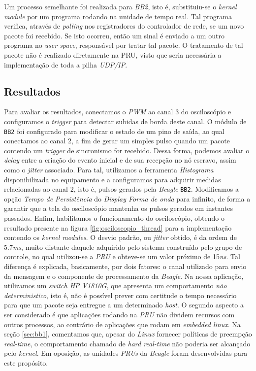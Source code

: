 \vspace{12pt}

Um processo semelhante foi realizada para \textit{BB2}, isto é, substituiu-se o
\textit{kernel module} por um programa rodando na unidade de tempo real. Tal
programa verifica, através de \textit{polling} nos registradores do controlador
de rede, se um novo pacote foi recebido. Se isto ocorreu, então um sinal é
enviado a um outro programa no \textit{user space}, responsável por tratar tal
pacote. O tratamento de tal pacote não é realizado diretamente na PRU, visto que
seria necessária a implementação de toda a pilha \textit{UDP/IP}.

\subsection {Resultados}

Para avaliar os resultados, conectamos o \textit{PWM} ao canal 3 do osciloscópio
e configuramos o \textit{trigger} para detectar subidas de borda deste canal. O
módulo de \texttt{BB2} foi configurado para modificar o estado de um pino de
saída, ao qual conectamos ao canal 2, a fim de gerar um simples pulso quando um
pacote contendo um \textit{trigger} de sincronismo for recebido. Dessa forma,
podemos avaliar o \textit{delay} entre a criação do evento inicial e de sua
recepção no nó escravo, assim como o \textit{jitter} associado. Para tal,
utilizamos a ferramenta \textit{Histograma} disponibilizada no equipamento e a
configuramos para adquirir medidas relacionadas ao canal 2, isto é, pulsos
gerados pela \textit{Beagle} \texttt{BB2}. Modificamos a opção \textit{Tempo de
Persistência} do \textit{Display Forma de onda} para infinito, de forma a
garantir que a tela do osciloscópio mantenha os pulsos gerados em instantes
passados. Enfim, habilitamos o funcionamento do osciloscópio, obtendo o
resultado presente na figura \ref{fig:osciloscopio_thread} para a implementação
contendo os \textit{kernel modules}. O desvio padrão, ou \textit{jitter} obtido,
é da ordem de 5.7\textit{ms}, muito distante daquele adquirido pelo sistema
construído pelo grupo de controle, no qual utilizou-se a \textit{PRU} e
obteve-se um valor próximo de 15\textit{ns}. Tal diferença é explicada,
basicamente, por dois fatores: o canal utilizado para envio da mensagem e o
componente de processamento da \textit{Beagle}. Na nossa aplicação, utilizamos
um \textit{switch HP V1810G}, que apresenta um comportamento \textit{não
deterministico}, isto é, não é possível prever com certitude o tempo necessário
para que um pacote seja entregue a um determinado \textit{host}. O segundo
aspecto a ser considerado é que aplicações rodando na \textit{PRU} não dividem
recursos com outros processos, ao contrário de aplicações que rodam em
\textit{embedded linux}. Na seção \ref{sec:bb1}, comentamos que, apesar do
\textit{Linux} fornecer políticas de preempção \textit{real-time}, o
comportamento chamado de \textit{hard real-time} não poderia ser alcançado pelo
\textit{kernel}. Em oposição, as unidades \textit{PRUs} da \textit{Beagle} foram
desenvolvidas para este propósito.

